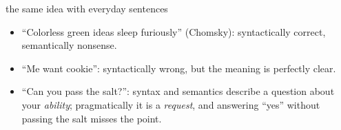 \begin{nbexample}{the same idea with everyday sentences}
\begin{itemize}[nosep]
  \item ``Colorless green ideas sleep furiously'' (Chomsky): syntactically correct,
        semantically nonsense.
  \item ``Me want cookie'': syntactically wrong, but the meaning is perfectly clear.
  \item ``Can you pass the salt?'': syntax and semantics describe a question about your
        \emph{ability}; pragmatically it is a \emph{request}, and answering ``yes''
        without passing the salt misses the point.
\end{itemize}
\end{nbexample}

